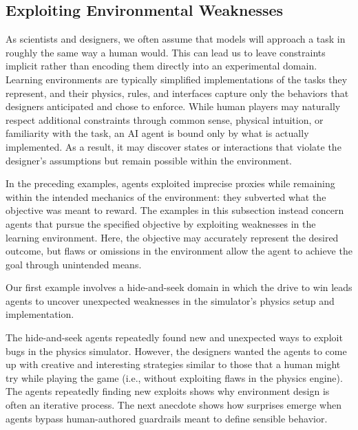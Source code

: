 \documentclass[10pt]{article}
\begin{document}
\subsection{Exploiting Environmental Weaknesses}
\label{breakingOut}

As scientists and designers, we often assume that models will approach a task in roughly the same way a human would.
This can lead us to leave constraints implicit rather than encoding them directly into an experimental domain.
Learning environments are typically simplified implementations of the tasks they represent, and their physics, rules, and interfaces capture only the behaviors that designers anticipated and chose to enforce.
While human players may naturally respect additional constraints through common sense, physical intuition, or familiarity with the task, an AI agent is bound only by what is actually implemented.
As a result, it may discover states or interactions that violate the designer's assumptions but remain possible within the environment.

In the preceding examples, agents exploited imprecise proxies while remaining within the intended mechanics of the environment: they subverted what the objective was meant to reward.
The examples in this subsection instead concern agents that pursue the specified objective by exploiting weaknesses in the learning environment.
Here, the objective may accurately represent the desired outcome, but flaws or omissions in the environment allow the agent to achieve the goal through unintended means.

Our first example involves a hide-and-seek domain in which the drive to win leads agents to uncover unexpected weaknesses in the simulator's physics setup and implementation.




The hide-and-seek agents repeatedly found new and unexpected ways to exploit bugs in the physics simulator.
However, the designers wanted the agents to come up with creative and interesting strategies similar to those that a human might try while playing the game (i.e., without exploiting flaws in the physics engine). 
The agents repeatedly finding new exploits shows why environment design is often an iterative process. 
The next anecdote shows how surprises emerge when agents bypass human-authored guardrails meant to define sensible behavior.


\end{document}
